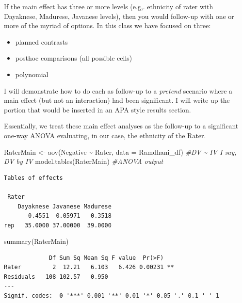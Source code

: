 \documentclass[
  11pt,
]{book}
\newenvironment{Shaded}{\begin{snugshade}}{\end{snugshade}}
\newcommand{\AttributeTok}[1]{\textcolor[rgb]{0.77,0.63,0.00}{#1}}
\newcommand{\CommentTok}[1]{\textcolor[rgb]{0.56,0.35,0.01}{\textit{#1}}}
\newcommand{\FunctionTok}[1]{\textcolor[rgb]{0.00,0.00,0.00}{#1}}
\newcommand{\NormalTok}[1]{#1}
\newcommand{\OtherTok}[1]{\textcolor[rgb]{0.56,0.35,0.01}{#1}}
\newcommand{\SpecialCharTok}[1]{\textcolor[rgb]{0.00,0.00,0.00}{#1}}
\providecommand{\tightlist}{%
  \setlength{\itemsep}{0pt}\setlength{\parskip}{0pt}}
\begin{document}
If the main effect has three or more levels (e.g,. ethnicity of rater with Dayaknese, Madurese, Javanese levels), then you would follow-up with one or more of the myriad of options. In this class we have focused on three:

\begin{itemize}
\tightlist
\item
  planned contrasts
\item
  posthoc comparisons (all possible cells)
\item
  polynomial
\end{itemize}

I will demonstrate how to do each as follow-up to a \emph{pretend} scenario where a main effect (but not an interaction) had been significant. I will write up the portion that would be inserted in an APA style results section.

Essentially, we treat these main effect analyses as the follow-up to a significant one-way ANOVA evaluating, in our case, the ethnicity of the Rater.

\begin{Shaded}
\begin{Highlighting}[]
\NormalTok{RaterMain }\OtherTok{\textless{}{-}} \FunctionTok{aov}\NormalTok{(Negative }\SpecialCharTok{\textasciitilde{}}\NormalTok{ Rater, }\AttributeTok{data =}\NormalTok{ Ramdhani\_df)  }\CommentTok{\#DV \textasciitilde{} IV I say, \textquotesingle{}DV by IV\textquotesingle{}}
\FunctionTok{model.tables}\NormalTok{(RaterMain)  }\CommentTok{\#ANOVA output}
\end{Highlighting}
\end{Shaded}

\begin{verbatim}
Tables of effects

 Rater 
    Dayaknese Javanese Madurese
      -0.4551  0.05971   0.3518
rep   35.0000 37.00000  39.0000
\end{verbatim}

\begin{Shaded}
\begin{Highlighting}[]
\FunctionTok{summary}\NormalTok{(RaterMain)}
\end{Highlighting}
\end{Shaded}

\begin{verbatim}
             Df Sum Sq Mean Sq F value  Pr(>F)   
Rater         2  12.21   6.103   6.426 0.00231 **
Residuals   108 102.57   0.950                   
---
Signif. codes:  0 '***' 0.001 '**' 0.01 '*' 0.05 '.' 0.1 ' ' 1
\end{verbatim}
\end{document}
